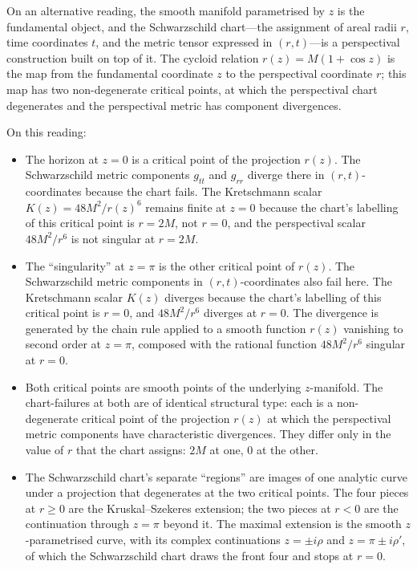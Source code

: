 \documentclass[11pt,a4paper]{article}
\theoremstyle{definition}
\begin{document}
On an alternative reading, the smooth manifold parametrised by $z$ is the fundamental object, and the Schwarzschild chart---the assignment of areal radii $r$, time coordinates $t$, and the metric tensor expressed in $(r, t)$---is a perspectival construction built on top of it. The cycloid relation $r(z) = M(1+\cos z)$ is the map from the fundamental coordinate $z$ to the perspectival coordinate $r$; this map has two non-degenerate critical points, at which the perspectival chart degenerates and the perspectival metric has component divergences.

On this reading:

\begin{itemize}
\item The horizon at $z = 0$ is a critical point of the projection $r(z)$. The Schwarzschild metric components $g_{tt}$ and $g_{rr}$ diverge there in $(r,t)$-coordinates because the chart fails. The Kretschmann scalar $K(z) = 48M^2/r(z)^6$ remains finite at $z = 0$ because the chart's labelling of this critical point is $r = 2M$, not $r = 0$, and the perspectival scalar $48M^2/r^6$ is not singular at $r = 2M$.

\item The ``singularity'' at $z = \pi$ is the other critical point of $r(z)$. The Schwarzschild metric components in $(r, t)$-coordinates also fail here. The Kretschmann scalar $K(z)$ diverges because the chart's labelling of this critical point is $r = 0$, and $48M^2/r^6$ diverges at $r = 0$. The divergence is generated by the chain rule applied to a smooth function $r(z)$ vanishing to second order at $z = \pi$, composed with the rational function $48M^2/r^6$ singular at $r = 0$.

\item Both critical points are smooth points of the underlying $z$-manifold. The chart-failures at both are of identical structural type: each is a non-degenerate critical point of the projection $r(z)$ at which the perspectival metric components have characteristic divergences. They differ only in the value of $r$ that the chart assigns: $2M$ at one, $0$ at the other.

\item The Schwarzschild chart's separate ``regions'' are images of one analytic curve under a projection that degenerates at the two critical points. The four pieces at $r \geq 0$ are the Kruskal--Szekeres extension; the two pieces at $r<0$ are the continuation through $z=\pi$ beyond it. The maximal extension is the smooth $z$-parametrised curve, with its complex continuations $z = \pm i\rho$ and $z = \pi \pm i\rho'$, of which the Schwarzschild chart draws the front four and stops at $r=0$.


\end{itemize}
\end{document}
